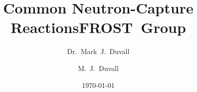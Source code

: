 \documentclass[table]{beamer}
\title{Common Neutron-Capture Reactions}
\author{Dr.~Mark~J.~Duvall}%
\institute{University of Hawai`i at M\={a}noa}
\date{\today}
\begin{document}
\newcommand{\ibd}{inverse beta decay (IBD)\renewcommand{\ibd}{IBD}}
\newcommand{\nb}{\textcolor{darkgreen}{$\bar{\nu_e}$}}

\newcommand{\dash}{\textbf{---}\ }				%
\newcommand{\bs}{\boldsymbol}					%
\newcommand{\nucl}[2]{{}^{#1}\mbox{#2}}				%
\newcommand{\barns}{~\mathrm{barns}}				%


\title{FROST~Group}
\author{M.~J.~Duvall}




\scriptsize
\end{document}
